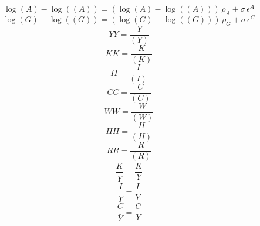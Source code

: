 \begin{dmath}
\log\left({A}\right)-\log\left(({A})\right)=\left(\log\left({A}\right)-\log\left(({A})\right)\right)\, {{\rho_{A}}}+{{\sigma}}\, {{\epsilon^{A}}}
\end{dmath}
\begin{dmath}
\log\left({G}\right)-\log\left(({G})\right)=\left(\log\left({G}\right)-\log\left(({G})\right)\right)\, {{\rho_{G}}}+{{\sigma}}\, {{\epsilon^{G}}}
\end{dmath}
\begin{dmath}
{YY}=\frac{{Y}}{({Y})}
\end{dmath}
\begin{dmath}
{KK}=\frac{{K}}{({K})}
\end{dmath}
\begin{dmath}
{II}=\frac{{I}}{({I})}
\end{dmath}
\begin{dmath}
{CC}=\frac{{C}}{({C})}
\end{dmath}
\begin{dmath}
{WW}=\frac{{W}}{({W})}
\end{dmath}
\begin{dmath}
{HH}=\frac{{H}}{({H})}
\end{dmath}
\begin{dmath}
{RR}=\frac{{R}}{({R})}
\end{dmath}
\begin{dmath}
{\frac{\bar{K}}{\bar{Y}}}=\frac{{K}}{{Y}}
\end{dmath}
\begin{dmath}
{\frac{\bar{I}}{\bar{Y}}}=\frac{{I}}{{Y}}
\end{dmath}
\begin{dmath}
{\frac{\bar{C}}{\bar{Y}}}=\frac{{C}}{{Y}}
\end{dmath}

